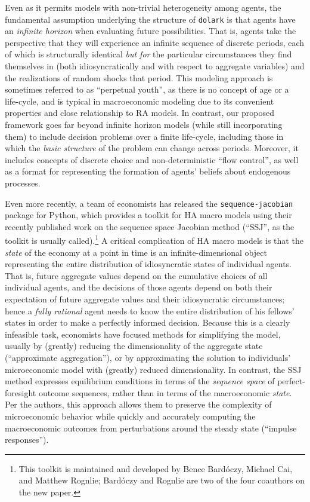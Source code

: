 \documentclass[12pt,pdftex,letterpaper]{article}
\begin{document}
Even as it permits models with non-trivial heterogeneity among agents, the fundamental assumption underlying the structure of \texttt{dolark} is that agents have an \textit{infinite horizon} when evaluating future possibilities. That is, agents take the perspective that they will experience an infinite sequence of discrete periods, each of which is structurally identical \textit{but for} the particular circumstances they find themselves in (both idiosyncratically and with respect to aggregate variables) and the realizations of random shocks that period. This modeling approach is sometimes referred to as ``perpetual youth'', as there is no concept of age or a life-cycle, and is typical in macroeconomic modeling due to its convenient properties and close relationship to RA models. In contrast, our proposed framework goes far beyond infinite horizon models (while still incorporating them) to include decision problems over a finite life-cycle, including those in which the \textit{basic structure} of the problem can change across periods. Moreover, it includes concepts of discrete choice and non-deterministic ``flow control'', as well as a format for representing the formation of agents' beliefs about endogenous processes.

Even more recently, a team of economists has released the \texttt{sequence-jacobian} package for Python, which provides a toolkit for HA macro models using their recently published work on the sequence space Jacobian method (``SSJ'', as the toolkit is usually called).\footnote{This toolkit is maintained and developed by Bence Bard\'{o}czy, Michael Cai, and Matthew Rognlie; Bard\'{o}czy and Rognlie are two of the four coauthors on the new paper.} A critical complication of HA macro models is that the \textit{state} of the economy at a point in time is an infinite-dimensional object representing the entire distribution of idiosyncratic states of individual agents. That is, future aggregate values depend on the cumulative choices of all individual agents, and the decisions of those agents depend on both their expectation of future aggregate values and their idiosyncratic circumstances; hence a \textit{fully rational} agent needs to know the entire distribution of his fellows' states in order to make a perfectly informed decision. Because this is a clearly infeasible task, economists have focused methods for simplifying the model, usually by (greatly) reducing the dimensionality of the aggregate state (``approximate aggregation''), or by approximating the solution to individuals' microeconomic model with (greatly) reduced dimensionality. In contrast, the SSJ method expresses equilibrium conditions in terms of the \textit{sequence space} of perfect-foresight outcome sequences, rather than in terms of the macroeconomic \textit{state}. Per the authors, this approach allows them to preserve the complexity of microeconomic behavior while quickly and accurately computing the macroeconomic outcomes from perturbations around the steady state (``impulse responses'').
\end{document}
